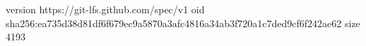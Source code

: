 version https://git-lfs.github.com/spec/v1
oid sha256:ea735d38d81df6f679ec9a5870a3afc4816a34ab3f720a1c7ded9cf6f242ae62
size 4193
